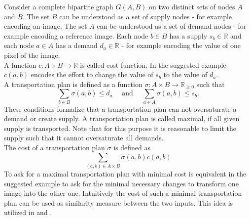 \documentclass[twoside]{scrartcl}
\begin{document}
Consider a complete bipartite graph $G(A,B)$ on two distinct sets of nodes $A$ and $B$. The set $B$ can be understood as a set of supply nodes - for example encoding an image. The set $A$ can be understood as a set of demand nodes - for example encoding a reference image. Each node $b\in B$ has a supply $s_b \in\mathbb{R}$ and each node $a\in A$ has a demand $d_a\in \mathbb{R}$ - for example encoding the value of one pixel of the image.\\
A function $c:A\times B\to \mathbb{R}$ is called cost function. In the suggested example $c(a,b)$ encodes the effort to change the value of $s_b$ to the value of $d_a$.\\
A transportation plan is defined as a function $\sigma: A\times B\to\mathbb{R}_{\ge 0}$ such that
\[ \sum\limits_{b\in B} \sigma(a, b) \le d_a \quad\text{ and }\quad \sum\limits_{a\in A} \sigma(a, b) \le s_b \text{.}\]
These conditions formalize that a transportation plan can not oversaturate a demand or create supply. A transportation plan is called maximal, if all given supply is transported. Note that for this purpose it is reasonable to limit the supply such that it cannot oversaturate all demands.\\
The cost of a transportation plan $\sigma$ is defined as 
\[ \sum\limits_{(a, b)\in A\times B}\sigma(a,b)c(a,b) \]
To ask for a maximal transportation plan with minimal cost is equivalent in the suggested example to ask for the minimal necessary changes to transform one image into the other one.
Intuitively the cost of such a minimal transportation plan can be used as similarity measure between the two inputs. This idea is utilized in \cite{A} and \cite{B}.\\
\end{document}
